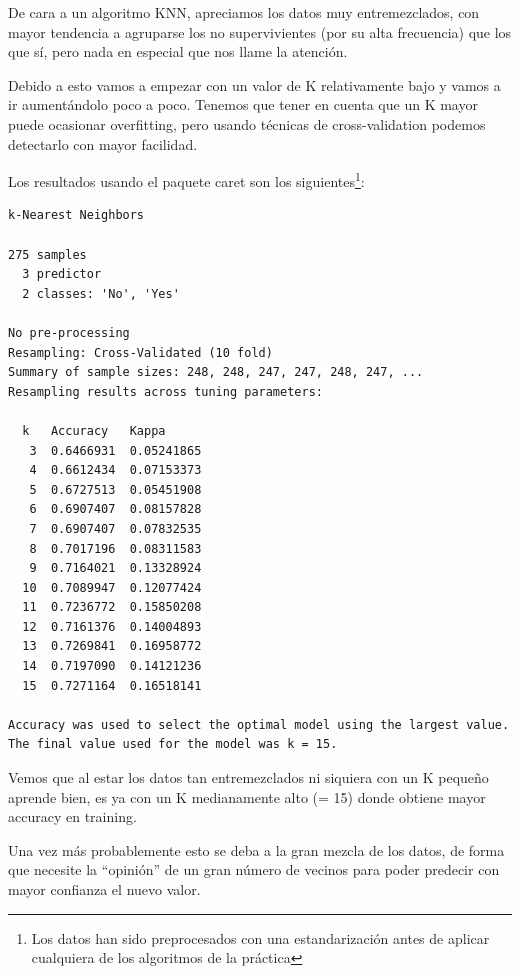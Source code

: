 De cara a un algoritmo KNN, apreciamos los datos muy entremezclados, con mayor tendencia a agruparse los no supervivientes (por su alta frecuencia) que los que sí, pero nada en especial que nos llame la atención.

Debido a esto vamos a empezar con un valor de K relativamente bajo y vamos a ir aumentándolo poco a poco. Tenemos que tener en cuenta que un K mayor puede ocasionar overfitting, pero usando técnicas de cross-validation podemos detectarlo con mayor facilidad.

\vspace{\baselineskip}

Los resultados usando el paquete caret son los siguientes\footnote{Los datos han sido preprocesados con una estandarización antes de aplicar cualquiera de los algoritmos de la práctica}:
\begin{verbatim}
k-Nearest Neighbors 

275 samples
  3 predictor
  2 classes: 'No', 'Yes' 

No pre-processing
Resampling: Cross-Validated (10 fold) 
Summary of sample sizes: 248, 248, 247, 247, 248, 247, ... 
Resampling results across tuning parameters:

  k   Accuracy   Kappa     
   3  0.6466931  0.05241865
   4  0.6612434  0.07153373
   5  0.6727513  0.05451908
   6  0.6907407  0.08157828
   7  0.6907407  0.07832535
   8  0.7017196  0.08311583
   9  0.7164021  0.13328924
  10  0.7089947  0.12077424
  11  0.7236772  0.15850208
  12  0.7161376  0.14004893
  13  0.7269841  0.16958772
  14  0.7197090  0.14121236
  15  0.7271164  0.16518141

Accuracy was used to select the optimal model using the largest value.
The final value used for the model was k = 15.
\end{verbatim}

\vspace{\baselineskip}

Vemos que al estar los datos tan entremezclados ni siquiera con un K pequeño aprende bien, es ya con un K medianamente alto (= 15) donde obtiene mayor accuracy en training.

\vspace{\baselineskip}

Una vez más probablemente esto se deba a la gran mezcla de los datos, de forma que necesite la ``opinión'' de un gran número de vecinos para poder predecir con mayor confianza el nuevo valor.


